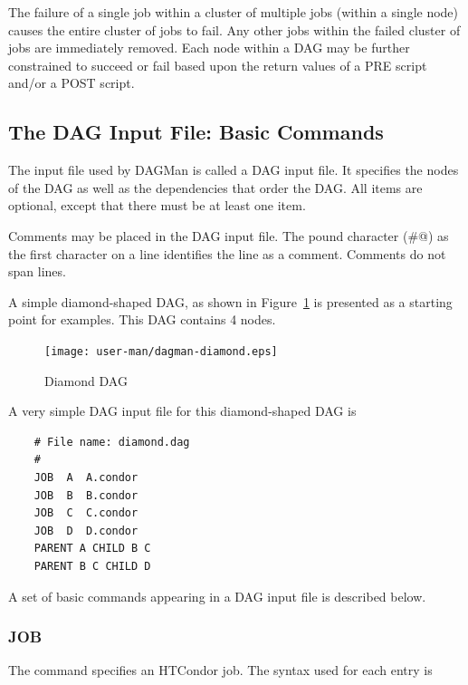 The failure of a single job within a cluster
of multiple jobs
(within a single node)
causes the entire cluster of jobs to fail.
Any other jobs within the failed cluster of jobs are
immediately removed.
Each node within a DAG may be further constrained  to succeed or fail
based upon the return values of a PRE script and/or a POST script.

\subsection{The DAG Input File: Basic Commands}

The input file used by DAGMan is called a DAG input file.
It specifies the nodes of the DAG as well as the dependencies
that order the DAG.
All items are optional, except that there must be at least one 
item.

Comments may be placed in the DAG input file.
The pound character (\verb@#@) as the first character on a
line identifies the line as a comment.
Comments do not span lines.

A simple diamond-shaped DAG, as shown in
Figure~\ref{fig:dagman-diamond}
is presented as a starting point for examples.
This DAG contains 4 nodes.

\begin{figure}[hbt]
\centering
\texttt{[image: user-man/dagman-diamond.eps]}
\caption{\label{fig:dagman-diamond}Diamond DAG}
\end{figure}


A very simple DAG input file for this diamond-shaped DAG is

\footnotesize
\begin{verbatim}
    # File name: diamond.dag
    #
    JOB  A  A.condor 
    JOB  B  B.condor 
    JOB  C  C.condor	
    JOB  D  D.condor
    PARENT A CHILD B C
    PARENT B C CHILD D
\end{verbatim}
\normalsize

A set of basic commands appearing in a DAG input file is described below.


\subsubsection{\label{sec:dagman_job_command}JOB}
\label{dagman:JOB}

The  command specifies an HTCondor job.
The syntax used for each  entry is

